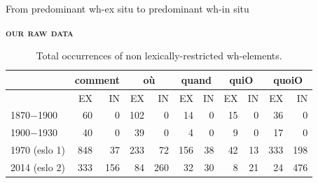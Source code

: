 \documentclass[lesson_slides]{subfiles}
\begin{document}
\begin{frame}[c]{From predominant wh-ex situ to predominant wh-in situ}

\textbf{\textsc{our raw data}}

\begin{table}[H]
    \centering
    \small
    \begin{adjustbox}
        \begin{tabular}{l|rr|rr|rr|rr|rr}
        {} & \multicolumn{2}{c}{comment}  & \multicolumn{2}{c}{où} & \multicolumn{2}{c}{quand} & \multicolumn{2}{c}{quiO}& \multicolumn{2}{c}{quoiO}\\
        \hline
        {} & EX & IN & EX & IN & EX & IN & EX & IN & EX & IN\\
        1870$-$1900 & 60 & 0 & 102 & 0 & 14 & 0 & 15 & 0 & 36 & 0\\
        1900$-$1930 & 40 & 0 & 39 & 0 & 4 & 0 & 9 & 0 & 17 & 0\\
        1970 (eslo 1) & 848 & 37 & 233 & 72 & 156 & 38 & 42 & 13 & 333 & 198\\
        2014 (eslo 2) & 333 & 156 & 84 & 260 & 32 & 30 & 8 & 21 & 24 & 476 \\
        \hline
        \end{tabular}
    \end{adjustbox}
\caption{\label{tab:samp3}Total occurrences of non lexically-restricted wh-elements.}
\end{table}
  
\end{frame}
\end{document}

